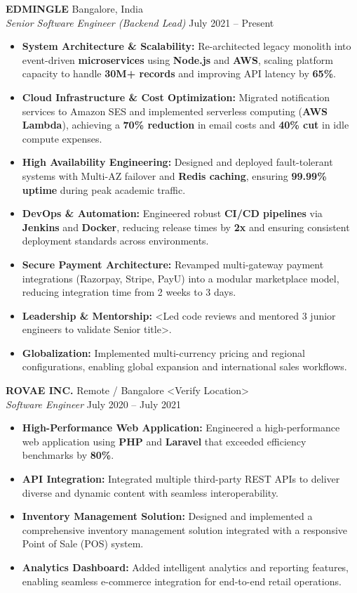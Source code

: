 \documentclass[11pt,a4paper]{article}
\begin{document}
\noindent \textbf{EDMINGLE} \hfill Bangalore, India \\
\textit{Senior Software Engineer (Backend Lead)} \hfill July 2021 -- Present
\begin{itemize}
    \item \textbf{System Architecture \& Scalability:} Re-architected legacy monolith into event-driven \textbf{microservices} using \textbf{Node.js} and \textbf{AWS}, scaling platform capacity to handle \textbf{30M+ records} and improving API latency by \textbf{65\%}.
    \item \textbf{Cloud Infrastructure \& Cost Optimization:} Migrated notification services to Amazon SES and implemented serverless computing (\textbf{AWS Lambda}), achieving a \textbf{70\% reduction} in email costs and \textbf{40\% cut} in idle compute expenses.
    \item \textbf{High Availability Engineering:} Designed and deployed fault-tolerant systems with Multi-AZ failover and \textbf{Redis caching}, ensuring \textbf{99.99\% uptime} during peak academic traffic.
    \item \textbf{DevOps \& Automation:} Engineered robust \textbf{CI/CD pipelines} via \textbf{Jenkins} and \textbf{Docker}, reducing release times by \textbf{2x} and ensuring consistent deployment standards across environments.
    \item \textbf{Secure Payment Architecture:} Revamped multi-gateway payment integrations (Razorpay, Stripe, PayU) into a modular marketplace model, reducing integration time from 2 weeks to 3 days.
    \item \textbf{Leadership \& Mentorship:} <Led code reviews and mentored 3 junior engineers to validate Senior title>.
    \item \textbf{Globalization:} Implemented multi-currency pricing and regional configurations, enabling global expansion and international sales workflows.
\end{itemize}

\vspace{10pt}

\noindent \textbf{ROVAE INC.} \hfill Remote / Bangalore <Verify Location> \\
\textit{Software Engineer} \hfill July 2020 -- July 2021
\begin{itemize}
    \item \textbf{High-Performance Web Application:} Engineered a high-performance web application using \textbf{PHP} and \textbf{Laravel} that exceeded efficiency benchmarks by \textbf{80\%}.
    \item \textbf{API Integration:} Integrated multiple third-party REST APIs to deliver diverse and dynamic content with seamless interoperability.
    \item \textbf{Inventory Management Solution:} Designed and implemented a comprehensive inventory management solution integrated with a responsive Point of Sale (POS) system.
    \item \textbf{Analytics Dashboard:} Added intelligent analytics and reporting features, enabling seamless e-commerce integration for end-to-end retail operations.
\end{itemize}
\end{document}
